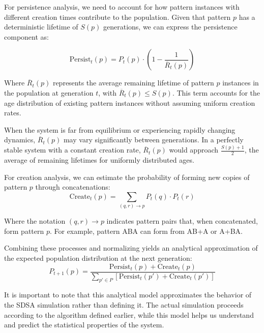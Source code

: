 \documentclass[preprint,12pt]{elsarticle}
\begin{document}
For persistence analysis, we need to account for how pattern instances with different creation times contribute to the population. Given that pattern \(p\) has a deterministic lifetime of \(S(p)\) generations, we can express the persistence component as:

\begin{equation}
\label{eq:persist-term}
\mathrm{Persist}_t(p) = P_t(p) \cdot \left(1 - \frac{1}{\overline{R}_t(p)}\right)
\end{equation}

Where \(\overline{R}_t(p)\) represents the average remaining lifetime of pattern \(p\) instances in the population at generation \(t\), with \(\overline{R}_t(p) \leq S(p)\). This term accounts for the age distribution of existing pattern instances without assuming uniform creation rates.

When the system is far from equilibrium or experiencing rapidly changing dynamics, \(\overline{R}_t(p)\) may vary significantly between generations. In a perfectly stable system with a constant creation rate, \(\overline{R}_t(p)\) would approach \(\frac{S(p)+1}{2}\), the average of remaining lifetimes for uniformly distributed ages.

For creation analysis, we can estimate the probability of forming new copies of pattern \(p\) through concatenations:
\begin{equation}
\label{eq:create-term}
\mathrm{Create}_t(p) = \sum_{(q,r) \to p} P_t(q) \cdot P_t(r)
\end{equation}

Where the notation \((q,r) \to p\) indicates pattern pairs that, when concatenated, form pattern \(p\). For example, pattern ABA can form from AB+A or A+BA.

Combining these processes and normalizing yields an analytical approximation of the expected population distribution at the next generation:
\begin{equation}
\label{eq:full-ba-update}
P_{t+1}(p) = \frac{
  \mathrm{Persist}_t(p) + \mathrm{Create}_t(p)
}{
  \sum_{p' \in P} 
  \left[
    \mathrm{Persist}_t(p') + \mathrm{Create}_t(p')
  \right]
}
\end{equation}

It is important to note that this analytical model approximates the behavior of the SDSA simulation rather than defining it. The actual simulation proceeds according to the algorithm defined earlier, while this model helps us understand and predict the statistical properties of the system.
\end{document}
